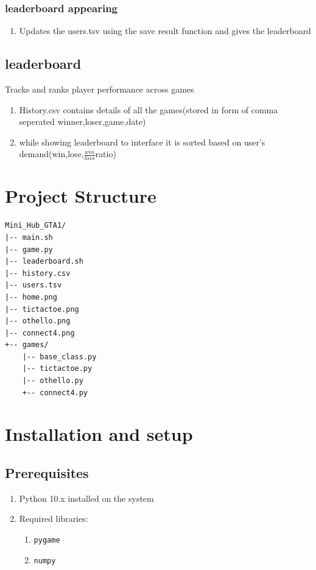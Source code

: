\documentclass{article}
\begin{document}
\subsubsection{leaderboard appearing}
\begin{enumerate}
    \item Updates the users.tsv using the save result function and gives the leaderboard
\end{enumerate}
\subsection{leaderboard}
Tracks and ranks player performance across games
\begin{enumerate}
    \item History.csv contains details of all the games(stored in form of comma seperated winner,loser,game,date)
    \item while showing leaderboard to interface it is sorted based on user's demand(win,lose,$\frac{win}{loss}$ratio)
    
\end{enumerate}
\section{Project Structure}
\begin{verbatim}
Mini_Hub_GTA1/
|-- main.sh              
|-- game.py              
|-- leaderboard.sh       
|-- history.csv          
|-- users.tsv            
|-- home.png            
|-- tictactoe.png        
|-- othello.png        
|-- connect4.png       
+-- games/             
    |-- base_class.py  
    |-- tictactoe.py    
    |-- othello.py   
    +-- connect4.py    
\end{verbatim}
\section{Installation and setup}
\subsection{Prerequisites}
\begin{enumerate}
    \item Python 10.x installed on the system
    \item Required libraries:
    \begin{enumerate}
        \item \texttt{pygame}
        \item \texttt{numpy}
    \end{enumerate}
\end{enumerate}
\end{document}
